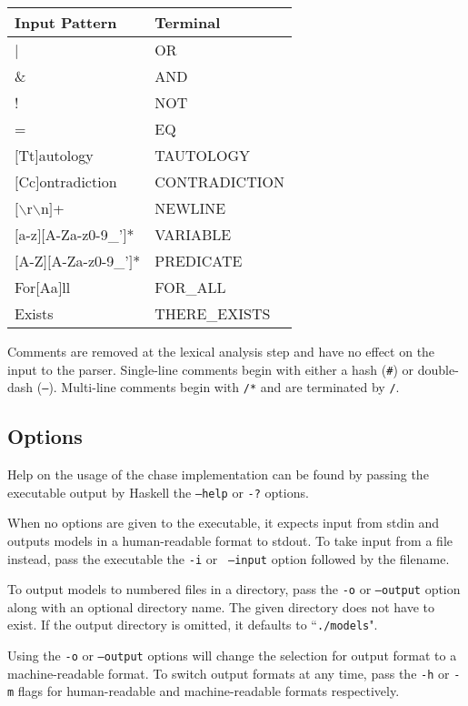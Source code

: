 		{\tt \begin{tabular}{|l|l|}
			\hline
			\textbf{Input Pattern} & \textbf{Terminal} \\
			\hline
			|                    & OR  \\
			\&                   & AND \\
			!                    & NOT \\
			=                    & EQ  \\
			$[$Tt$]$autology     & TAUTOLOGY \\
			$[$Cc$]$ontradiction & CONTRADICTION \\
			$[\backslash$r$\backslash$n$]$+ & NEWLINE \\
			$[$a-z$][$A-Za-z0-9\_'$]$* & VARIABLE \\
			$[$A-Z$][$A-Za-z0-9\_'$]$* & PREDICATE \\
			For$[$Aa$]$ll        & FOR\_ALL \\
			Exists               & THERE\_EXISTS \\
			\hline
		\end{tabular} }

		Comments are removed at the lexical analysis step and have no effect on
		the input to the parser.  Single-line comments begin with either a hash
		({\tt \#}) or double-dash ({\tt --}). Multi-line comments begin with
		{\tt /*} and are terminated by {\tt */}.

	\subsection{Options}

		Help on the usage of the chase implementation can be found by passing
		the executable output by Haskell the {\tt --help} or {\tt -?} options.

		When no options are given to the executable, it expects input from
		stdin and outputs models in a human-readable format to stdout. To take
		input from a file instead, pass the executable the {\tt -i} or {\tt
		--input} option followed by the filename.

		To output models to numbered files in a directory, pass the {\tt -o} or
		{\tt --output} option along with an optional directory name. The given
		directory does not have to exist. If the output directory is omitted,
		it defaults to ``{\tt ./models}".

		Using the {\tt -o} or {\tt --output} options will change the selection
		for output format to a machine-readable format. To switch output formats
		at any time, pass the {\tt -h} or {\tt -m} flags for human-readable and
		machine-readable formats respectively.


